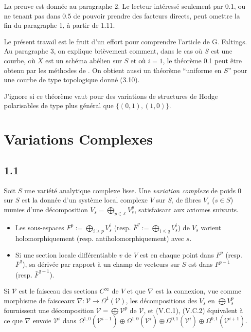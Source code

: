 \documentclass[12pt,a4paper]{article}
\theoremstyle{plain}
\theoremstyle{definition}
\newcommand{\ZZ}{\mathbb{Z}}
\begin{document}
La preuve est donn\'{e}e au paragraphe 2. Le lecteur int\'{e}ress\'{e} seulement par 0.1, ou ne tenant pas dans 0.5 de pouvoir prendre des facteurs directs, peut omettre la fin du paragraphe 1, \`{a} partir de 1.11.

Le pr\'{e}sent travail est le fruit d'un effort pour comprendre l'article \cite{Faltings} de G. Faltings. Au paragraphe 3, on explique bri\`{e}vement comment, dans le cas o\`{u} $S$ est une courbe, o\`{u} $X$ est un sch\'{e}ma ab\'{e}lien sur $S$ et o\`{u} $i = 1$, le th\'{e}or\`{e}me 0.1 peut \^{e}tre obtenu par les m\'{e}thodes de \cite{Faltings}. On obtient aussi un th\'{e}or\`{e}me ``uniforme en $S$'' pour une courbe de type topologique donn\'{e} (3.10).

J'ignore si ce th\'{e}or\`{e}me vaut pour des variations de structures de Hodge polarisables de type plus g\'{e}n\'{e}ral que $\{(0,1), (1,0)\}$.


\section{Variations Complexes}

\subsection*{1.1}
Soit $S$ une vari\'{e}t\'{e} analytique complexe lisse. Une \emph{variation complexe} de poids $0$ sur $S$ est la donn\'{e}e d'un syst\`{e}me local complexe $V$ sur $S$, de fibres $V_{s}$ ($s \in S$) munies d'une d\'{e}composition $V_{s} = \bigoplus_{p \in \ZZ} V_{s}^{p}$, satisfaisant aux axiomes suivants.

\begin{itemize}
\item[(V.C.1)] Les sous-espaces $F^{p} := \bigoplus_{i \geq p} V_{s}^{i}$ (resp. $\bar{F}^{q} := \bigoplus_{i \leq q} V_{s}^{i}$) de $V_{s}$ varient holomorphiquement (resp. antiholomorphiquement) avec $s$.
\item[(V.C.2)] Si une section locale diff\'{e}rentiable $v$ de $V$ est en chaque point dans $F^{p}$ (resp. $\bar{F}^{q}$), sa d\'{e}riv\'{e}e par rapport \`{a} un champ de vecteurs sur $S$ est dans $F^{p-1}$ (resp. $\bar{F}^{q-1}$).
\end{itemize}

Si $\mathcal{V}$ est le faisceau des sections $C^{\infty}$ de $V$ et que $\nabla$ est la connexion, vue comme morphisme de faisceaux $\nabla : \mathcal{V} \to \Omega^{1}(\mathcal{V})$, les d\'{e}compositions des $V_{s}$ en $\bigoplus V_{s}^{p}$ fournissent une d\'{e}composition $\mathcal{V} = \bigoplus \mathcal{V}^{p}$ de $\mathcal{V}$, et (V.C.1), (V.C.2) \'{e}quivalent \`{a} ce que $\nabla$ envoie $\mathcal{V}^{i}$ dans $\Omega^{1,0}(\mathcal{V}^{i-1}) \oplus \Omega^{1,0}(\mathcal{V}^{i}) \oplus \Omega^{0,1}(\mathcal{V}^{i}) \oplus \Omega^{0,1}(\mathcal{V}^{i+1})$.
\end{document}
